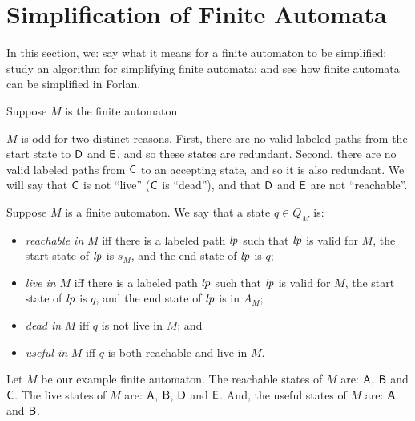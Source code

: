\section{Simplification of Finite Automata}
\label{SimplificationOfFiniteAutomata}

%
%
In this section, we: say what it means for a finite automaton to be
simplified; study an algorithm for simplifying finite automata; and
see how finite automata can be simplified in Forlan.

Suppose $M$ is the finite automaton
\begin{center}

\end{center}
$M$ is odd for two distinct reasons.  First, there are no valid
labeled paths from the start state to $\mathsf{D}$ and $\mathsf{E}$, and so these
states are redundant.  Second, there are no valid labeled paths from
$\mathsf{C}$ to an accepting state, and so it is also redundant.  We will
say that $\mathsf{C}$ is not ``live'' ($\mathsf{C}$ is ``dead''), and that $\mathsf{D}$
and $\mathsf{E}$ are not ``reachable''.

Suppose $M$ is a finite automaton.  We say that a state $q\in Q_M$ is:
\begin{itemize}
\item \emph{reachable in} $M$ iff there is a labeled path ${\it lp}$ such that
%
%
${\it lp}$ is valid for $M$, the start state of ${\it lp}$ is $s_M$, and
the end state of ${\it lp}$ is $q$;

\item \emph{live in} $M$ iff there is a labeled path ${\it lp}$ such that
%
%
${\it lp}$ is valid for $M$, the start state of ${\it lp}$ is $q$, and
the end state of ${\it lp}$ is in $A_M$;

\item \emph{dead in} $M$ iff $q$ is not live in $M$; and
%
%

\item \emph{useful in} $M$ iff $q$ is both reachable and live in $M$.
%
%
\end{itemize}

Let $M$ be our example finite automaton.
The reachable states of $M$ are: $\mathsf{A}$, $\mathsf{B}$ and $\mathsf{C}$.
The live states of $M$ are: $\mathsf{A}$, $\mathsf{B}$, $\mathsf{D}$ and $\mathsf{E}$.
And, the useful states of $M$ are: $\mathsf{A}$ and $\mathsf{B}$.

